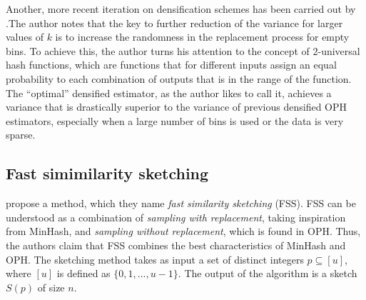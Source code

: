 Another, more recent iteration on densification schemes has been carried out by \cite{Shrivastava17}.The author notes that the key to further reduction of the variance for larger values of $k$ is to increase the randomness in the replacement process for empty bins. To achieve this, the author turns his attention to the concept of $2$-universal hash functions, which are functions that for different inputs assign an equal probability to each combination of outputs that is in the range of the function. %
The ``optimal'' densified estimator, as the author likes to call it, achieves a variance that is drastically superior to the variance of previous densified OPH estimators, especially when a large number of bins is used or the data is very sparse. 

\subsection{Fast simimilarity sketching}
\label{subsec:fss}
\cite{DahlgaardKT17} propose a method, which they name \textit{fast similarity sketching} (FSS). %
FSS can be understood as a combination of \textit{sampling with replacement}, taking inspiration from MinHash, and \textit{sampling without replacement}, which is found in OPH. Thus, the authors claim that FSS combines the best characteristics of MinHash and OPH. The sketching method takes as input a set of distinct integers $p \subseteq [u] $, where $[u]$ is defined as $\{0,1,...,u-1\}$. The output of the algorithm is a sketch $S(p)$ of size $n$. 

